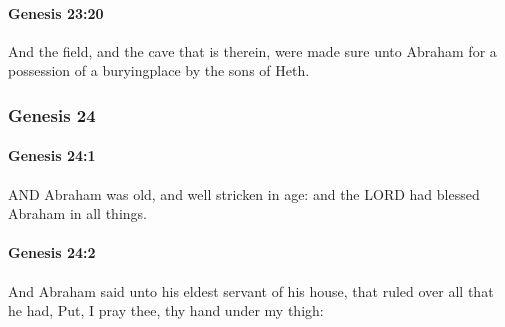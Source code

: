 		\paragraph{Genesis 23:20} %
			\label{GENESIS-23-20}

			And the field, and the cave that is therein, were made sure unto Abraham for a possession of a buryingplace by the sons of Heth.


	\subsubsection{Genesis 24} %
		\label{GENESIS-24}
		
		\paragraph{Genesis 24:1} %
			\label{GENESIS-24-1}

			AND Abraham was old, and well stricken in age: and the LORD had blessed Abraham in all things.


		\paragraph{Genesis 24:2} %
			\label{GENESIS-24-2}

			And Abraham said unto his eldest servant of his house, that ruled over all that he had, Put, I pray thee, thy hand under my thigh:

